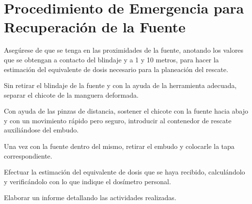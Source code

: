 \section*{Procedimiento de Emergencia para Recuperación de la Fuente}

Asegúrese de que se tenga en las proximidades de la fuente, anotando los valores que se obtengan a contacto del blindaje y a 1 y 10 metros, para hacer la estimación del equivalente de dosis necesario para la planeación del rescate.

Sin retirar el blindaje de la fuente y con la ayuda de la herramienta adecuada, separar el chicote de la manguera deformada.

Con ayuda de las pinzas de distancia, sostener el chicote con la fuente hacia abajo y con un movimiento rápido pero seguro, introducir al contenedor de rescate auxiliándose del embudo.

Una vez con la fuente dentro del mismo, retirar el embudo y colocarle la tapa correspondiente.

Efectuar la estimación del equivalente de dosis que se haya recibido, calculándolo y verificándolo con lo que indique el dosímetro personal.

Elaborar un informe detallando las actividades realizadas.